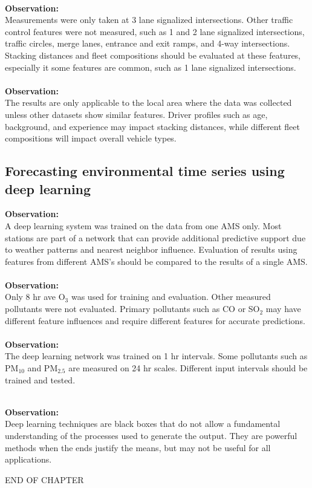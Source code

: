 \noindent\\
\textbf{Observation:}\\
Measurements were only taken at 3 lane signalized intersections. Other traffic control features were not measured, such as 1 and 2 lane signalized intersections, traffic circles, merge lanes, entrance and exit ramps, and 4-way intersections.  Stacking distances and fleet compositions should be evaluated at these features, especially it some features are common, such as 1 lane signalized intersections.\\

\noindent\\
\textbf{Observation:}\\
The results are only applicable to the local area where the data was collected unless other datasets show similar features. Driver profiles such as age, background, and experience may impact stacking distances, while different fleet compositions will impact overall vehicle types.

\subsection*{Forecasting environmental time series using deep learning}
\noindent
\textbf{Observation:}\\
A deep learning system was trained on the data from one AMS only. Most stations are part of a network that can provide additional predictive support due to weather patterns and nearest neighbor influence. Evaluation of results using features from different AMS's should be compared to the results of a single AMS.\\

\noindent\\
\textbf{Observation:}\\
Only 8 hr ave O$_{3}$ was used for training and evaluation. Other measured pollutants were not evaluated. Primary pollutants such as CO or SO$_{2}$  may have different feature influences and require different features for accurate predictions.\\

\noindent\\
\textbf{Observation:}\\
The deep learning network was trained on 1 hr intervals. Some pollutants such as PM$_{10}$ and PM$_{2.5}$ are measured on 24 hr scales. Different input intervals should be trained and tested.

\noindent\\
\textbf{Observation:}\\
Deep learning techniques are black boxes that do not allow a fundamental understanding of the processes used to generate the output. They are powerful methods when the ends justify the means, but may not be useful for all applications.

\bigskip

\begin{center}
END OF CHAPTER
\end{center}
